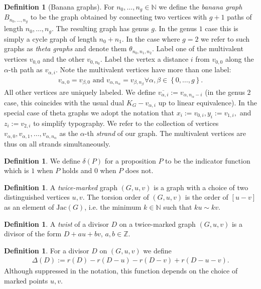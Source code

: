 \documentclass[11pt]{article}
\theoremstyle{definition}
\newtheorem{defi}[theo]{Definition}
\numberwithin{equation}{section}
\newcommand{\N}{\mathbb{N}}
\newcommand{\Z}{\mathbb{Z}}
\newcommand{\jac}[1]{\mathrm{Jac}\left({#1}\right)}
\newcommand{\set}[1]{\left\{{#1}\right\}}
\begin{document}
\begin{defi}[Banana graphs]\label{def-BanGraph}
    For $n_0,\dots,n_g \in \N$ we define the \textit{banana graph} $B_{n_0,\dots,n_g}$ to be the graph obtained by connecting two vertices with $g+1$ paths of length $n_0,\dots,n_g$. The resulting graph has genus $g$. In the genus $1$ case this is simply a cycle graph of length $n_0+n_1$. In the case where $g = 2$ we refer to such graphs as \textit{theta graphs} and denote them $\theta_{n_0,n_1,n_2}$. Label one of the multivalent vertices $v_{0,0}$ and the other $v_{0,n_0}$. Label the vertex a distance $i$ from $v_{0,0}$ along the $\alpha$-th path as $v_{\alpha,i}$. Note the multivalent vertices have more than one label:
    \begin{align*}
        v_{\alpha,0} = v_{\beta,0} \text{ and } v_{\alpha,n_\alpha} = v_{\beta,n_\beta} \forall \alpha,\beta \in \set{0,\dots,g}.
    \end{align*}
    All other vertices are uniquely labeled. We define $\overline{v_{\alpha,i}}:= v_{\alpha,n_\alpha-i}$ (in the genus $2$ case, this coincides with the usual dual $K_G-v_{\alpha,i}$ up to linear equivalence). In the special case of theta graphs we adopt the notation that $x_i:= v_{0,i}, y_i := v_{1,i},$ and $z_i:= v_{2,i}$ to simplify typography. We refer to the collection of vertices $v_{\alpha,0},v_{\alpha,1},\dots,v_{\alpha,n_\alpha}$ as the $\alpha$-th \textit{strand} of  our graph. The multivalent vertices are thus on all strands simultaneously.
\end{defi}

\begin{defi}\label{def-delt}
We define $\delta(P)$ for a proposition $P$ to be the indicator function which is $1$ when $P$ holds and $0$ when $P$ does not.
\end{defi}

\begin{defi}\label{def-TwMkGraph}
A \textit{twice-marked} graph $(G,u,v)$ is a graph with a choice of two distinguished vertices $u,v$. The torsion order of $(G,u,v)$ is the order of $[u-v]$ as an element of $\jac{G}$, i.e. the minimum $k \in \N$ such that $ku \sim kv$.
\end{defi}

\begin{defi}\label{def-Twist}
A \textit{twist} of a divisor $D$ on a twice-marked graph $(G,u,v)$ is a divisor of the form $D+au+bv$, $a,b \in \Z$.
\end{defi}

\begin{defi}\label{def-Delt}
For a divisor $D$ on $(G,u,v)$ we define
\begin{align*}
    \Delta(D):=r(D) - r(D-u) - r(D-v) + r(D-u-v).
\end{align*}
Although suppressed in the notation, this function depends on the choice of marked points $u,v$.
\end{defi}
\end{document}
